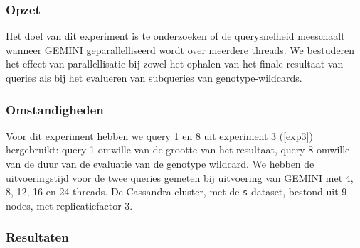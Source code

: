 \subsubsection{Opzet}

Het doel van dit experiment is te onderzoeken of de querysnelheid meeschaalt wanneer GEMINI geparallelliseerd wordt over meerdere threads. We bestuderen het effect van parallellisatie bij zowel het ophalen van het finale resultaat van queries als bij het evalueren van subqueries van genotype-wildcards.

\subsubsection{Omstandigheden}

Voor dit experiment hebben we query 1 en 8 uit experiment 3 (\ref{exp3}) hergebruikt: query 1 omwille van de grootte van het resultaat, query 8 omwille van de duur van de evaluatie van de genotype wildcard. We hebben de uitvoeringstijd voor de twee queries gemeten bij uitvoering van GEMINI met 4, 8, 12, 16 en 24 threads. De Cassandra-cluster, met de \texttt{s}-dataset, bestond uit 9 nodes, met replicatiefactor 3.

\newpage
\subsubsection{Resultaten}

